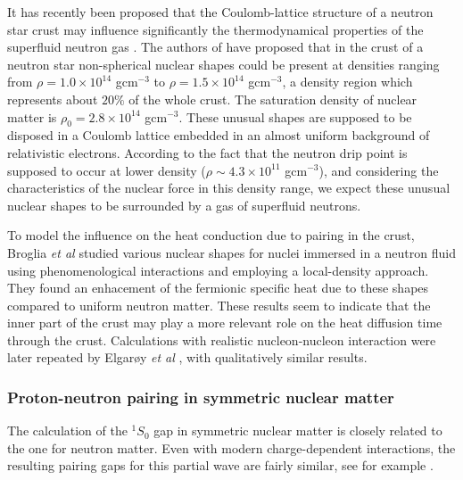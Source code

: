 \documentclass[rmp,aps,floatfix]{revtex4}
\begin{document}
It has recently been proposed that the 
Coulomb-lattice structure of a neutron 
star  crust may influence significantly  the thermodynamical 
properties  of the superfluid neutron gas \cite{broglia1994}. 
The authors of \cite{pr95}  have  proposed that in the crust 
of a neutron star non-spherical nuclear shapes could be present at
densities ranging from $\rho=1.0\times 10^{14}$ gcm$^{-3}$ to
$\rho=1.5\times 10^{14}$ gcm$^{-3}$, a density 
region which represents about $20\%$ of the whole crust. The 
saturation density of nuclear matter is $\rho_0 =2.8\times 10^{14}$
gcm$^{-3}$.
These unusual 
shapes  are supposed \cite{pr95}  
to be disposed in a Coulomb lattice embedded in an
almost uniform background of relativistic electrons. According to the 
fact that the neutron drip point is supposed to occur at lower density
($\rho\sim 4.3 \times 10^{11}$ gcm$^{-3}$), 
and considering the characteristics of the nuclear force in 
this density range, we expect  these
unusual nuclear shapes to be  
surrounded by a gas of superfluid neutrons. 

To model the influence on the heat conduction due to pairing in the crust,
Broglia {\em et al} \cite{broglia1994} studied various 
nuclear shapes for nuclei immersed in a neutron fluid using phenomenological
interactions and employing a local-density approach. They found
an enhacement of the fermionic specific heat due to these shapes
compared to uniform neutron matter. 
These results seem to indicate that the inner part 
of the crust may play a more relevant role on the heat diffusion time 
through the crust.  Calculations with realistic nucleon-nucleon 
interaction were later repeated by Elgar{\o}y {\em et al} \cite{elgaprd},
with qualitatively similar results.


\subsubsection{Proton-neutron pairing in symmetric nuclear matter}
\label{subsubsec:NN_to_pairing_subsub2}


The calculation of the $^1S_0$ gap in symmetric nuclear matter is  
closely related to the one for neutron matter.  Even with modern 
charge-dependent interactions, the resulting pairing gaps for 
this partial wave are fairly similar,
see for example \cite{eh98}.
\end{document}
